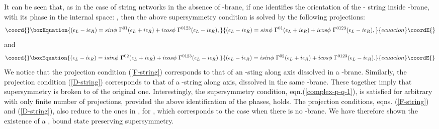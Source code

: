 \documentclass[a4paper,12pt]{article}
\begin{document}
It can be seen that, as in the case of string networks in the absence
of \coordHE{}-brane,  
if one identifies the orientation of the \coordHE{}-
string inside \coordHE{}-brane, with its phase in the internal space:
\coordHE{}, then the above supersymmetry 
condition is solved by the following projections:
\begin{equation}\coord{}\boxEquation{
(\epsilon_L - i \epsilon_R) =  sin\phi ~\Gamma^{0 1} 
              (\epsilon_L + i \epsilon_R) + 
           i cos\phi ~\Gamma^{0 1 2 3} (\epsilon_L - i \epsilon_R),
\label{F-string}
}{
(\epsilon_L - i \epsilon_R) =  sin\phi ~\Gamma^{0 1} 
              (\epsilon_L + i \epsilon_R) + 
           i cos\phi ~\Gamma^{0 1 2 3} (\epsilon_L - i \epsilon_R),
}{ecuacion}\coordE{}\end{equation}
and
\begin{equation}\coord{}\boxEquation{
(\epsilon_L - i \epsilon_R) = i sin\phi ~\Gamma^{0 2} 
              (\epsilon_L + i \epsilon_R) + 
           i cos\phi ~\Gamma^{0 1 2 3} (\epsilon_L - i \epsilon_R).
\label{D-string}
}{
(\epsilon_L - i \epsilon_R) = i sin\phi ~\Gamma^{0 2} 
              (\epsilon_L + i \epsilon_R) + 
           i cos\phi ~\Gamma^{0 1 2 3} (\epsilon_L - i \epsilon_R).
}{ecuacion}\coordE{}\end{equation}
We notice that the projection condition (\ref{F-string}) corresponds
to that of an \coordHE{}-sting along \coordHE{} axis dissolved in a \coordHE{}-brane. 
Similarly, the projection condition
(\ref{D-string}) corresponds to that of a \coordHE{}-string along \coordHE{} 
axis, dissolved in the same \coordHE{}-brane. These together imply that
supersymmetry is broken to \coordHE{} of the original one. Interestingly, 
the supersymmetry condition, eqn.(\ref{complex-p-q-1}), 
is satisfied for arbitrary \coordHE{} with 
only finite number of projections, provided the above identification
of the phases, \coordHE{} holds. 
The projection conditions, eqns. (\ref{F-string}) 
and (\ref{D-string}), also reduce to the ones in \cite{sen}, for 
\coordHE{}, which corresponds to the case when 
there is no \coordHE{}-brane.  
We have therefore shown the existence of a 
\coordHE{},  bound state preserving \coordHE{} 
supersymmetry. 
\end{document}
